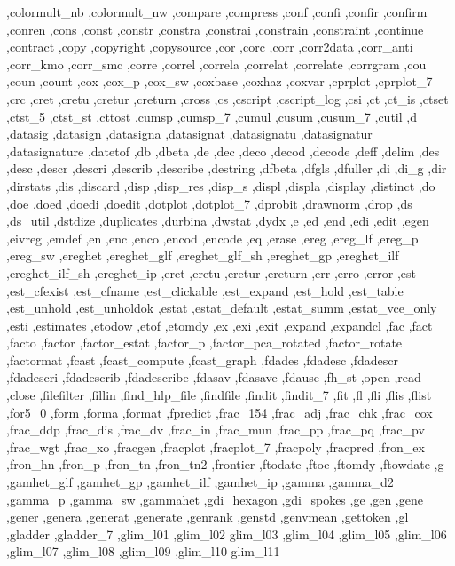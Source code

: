 {{    ,colormult_nb ,colormult_nw ,compare ,compress ,conf ,confi
    ,confir ,confirm ,conren ,cons ,const ,constr ,constra ,constrai
    ,constrain ,constraint ,continue ,contract ,copy ,copyright
    ,copysource ,cor ,corc ,corr ,corr2data ,corr_anti ,corr_kmo
    ,corr_smc ,corre ,correl ,correla ,correlat ,correlate ,corrgram
    ,cou ,coun ,count ,cox ,cox_p ,cox_sw ,coxbase ,coxhaz ,coxvar
    ,cprplot ,cprplot_7 ,crc ,cret ,cretu ,cretur ,creturn ,cross ,cs
    ,cscript ,cscript_log ,csi ,ct ,ct_is ,ctset ,ctst_5 ,ctst_st
    ,cttost ,cumsp ,cumsp_7 ,cumul ,cusum ,cusum_7 ,cutil ,d ,datasig
    ,datasign ,datasigna ,datasignat ,datasignatu ,datasignatur
    ,datasignature ,datetof ,db ,dbeta ,de ,dec ,deco ,decod ,decode
    ,deff ,delim ,des ,desc ,descr ,descri ,describ ,describe ,destring
    ,dfbeta ,dfgls ,dfuller ,di ,di_g ,dir ,dirstats ,dis ,discard
    ,disp ,disp_res ,disp_s ,displ ,displa ,display ,distinct ,do
    ,doe ,doed ,doedi ,doedit ,dotplot ,dotplot_7 ,dprobit ,drawnorm
    ,drop ,ds ,ds_util ,dstdize ,duplicates ,durbina ,dwstat ,dydx ,e
    ,ed ,end ,edi ,edit ,egen ,eivreg ,emdef ,en ,enc ,enco ,encod ,encode
    ,eq ,erase ,ereg ,ereg_lf ,ereg_p ,ereg_sw ,ereghet ,ereghet_glf
    ,ereghet_glf_sh ,ereghet_gp ,ereghet_ilf ,ereghet_ilf_sh ,ereghet_ip
    ,eret ,eretu ,eretur ,ereturn ,err ,erro ,error ,est ,est_cfexist
    ,est_cfname ,est_clickable ,est_expand ,est_hold ,est_table
    ,est_unhold ,est_unholdok ,estat ,estat_default ,estat_summ
    ,estat_vce_only ,esti ,estimates ,etodow ,etof ,etomdy ,ex ,exi
    ,exit ,expand ,expandcl ,fac ,fact ,facto ,factor ,factor_estat
    ,factor_p ,factor_pca_rotated ,factor_rotate ,factormat ,fcast
    ,fcast_compute ,fcast_graph ,fdades ,fdadesc ,fdadescr ,fdadescri
    ,fdadescrib ,fdadescribe ,fdasav ,fdasave ,fdause ,fh_st
    ,open ,read ,close ,filefilter ,fillin
    ,find_hlp_file ,findfile ,findit ,findit_7 ,fit ,fl ,fli ,flis
    ,flist ,for5_0 ,form ,forma ,format ,fpredict ,frac_154 ,frac_adj
    ,frac_chk ,frac_cox ,frac_ddp ,frac_dis ,frac_dv ,frac_in ,frac_mun
    ,frac_pp ,frac_pq ,frac_pv ,frac_wgt ,frac_xo ,fracgen ,fracplot
    ,fracplot_7 ,fracpoly ,fracpred ,fron_ex ,fron_hn ,fron_p ,fron_tn
    ,fron_tn2 ,frontier ,ftodate ,ftoe ,ftomdy ,ftowdate ,g ,gamhet_glf
    ,gamhet_gp ,gamhet_ilf ,gamhet_ip ,gamma ,gamma_d2 ,gamma_p
    ,gamma_sw ,gammahet ,gdi_hexagon ,gdi_spokes ,ge ,gen ,gene ,gener
    ,genera ,generat ,generate ,genrank ,genstd ,genvmean ,gettoken
    ,gl ,gladder ,gladder_7 ,glim_l01 ,glim_l02 glim_l03 ,glim_l04
    ,glim_l05 ,glim_l06 ,glim_l07 ,glim_l08 ,glim_l09 ,glim_l10 glim_l11
}}
